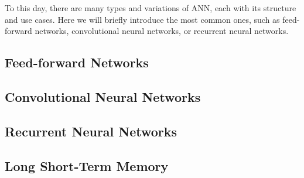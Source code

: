 
To this day, there are many types and variations of ANN, each with its structure and use cases. Here we will briefly introduce the most common ones, such as feed-forward networks, convolutional neural networks, or recurrent neural networks.

\subsection{Feed-forward Networks}

\subsection{Convolutional Neural Networks}

\subsection{Recurrent Neural Networks}

\subsection{Long Short-Term Memory}

